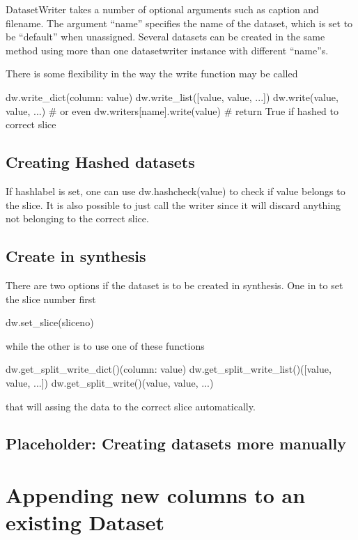 DatasetWriter takes a number of optional arguments such as caption and
filename.  The argument ``name'' specifies the name of the dataset,
which is set to be ``default'' when unassigned.  Several datasets can
be created in the same method using more than one datasetwriter
instance with different ``name''s.

There is some flexibility in the way the write function may be called

\begin{python}
  dw.write_dict({column: value})
  dw.write_list([value, value, ...])
  dw.write(value, value, ...)
  # or even
  dw.writers[name].write(value)  # return True if hashed to correct slice
\end{python}



\subsection{Creating Hashed datasets}

If hashlabel is set, one can use dw.hashcheck(value) to check if value
belongs to the slice.  It is also possible to just call the writer
since it will discard anything not belonging to the correct slice.



\subsection{Create in synthesis}

There are two options if the dataset is to be created in synthesis.
One in to set the slice number first

\begin{python}
  dw.set_slice(sliceno)
\end{python}
while the other is to use one of these functions

\begin{python}
  dw.get_split_write_dict()({column: value})
  dw.get_split_write_list()([value, value, ...])
  dw.get_split_write()(value, value, ...)
\end{python}
that will assing the data to the correct slice automatically.

\subsection{Placeholder:  Creating datasets more manually}


\newpage
\section{Appending new columns to an existing Dataset}

